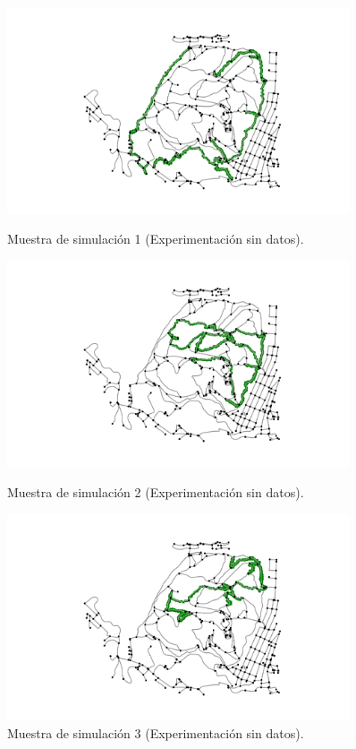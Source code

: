 \begin{figure}[!htb]
\centering
\begin{minipage}{0.70\textwidth}
\includegraphics[width=0.9\textwidth]{./Imagenes/SimulatedTrack1Empty.png}
\caption{Muestra de simulación 1 (Experimentación sin datos).}
\label{figure:SimulatedTrack1}
\end{minipage}
\begin{minipage}{0.48\textwidth}
\includegraphics[width=0.9\textwidth]{./Imagenes/SimulatedTrack2Empty.png}
\caption{Muestra de simulación 2 (Experimentación sin datos).}
\label{figure:SimulatedTrack2}
\end{minipage}
\hfill 
\begin{minipage}{0.48\textwidth}
\includegraphics[width=0.9\textwidth]{./Imagenes/SimulatedTrack3Empty.png}
\caption{Muestra de simulación 3 (Experimentación sin datos).}
\label{figure:SimulatedTrack3}
\end{minipage}
\end{figure}
\newpage

